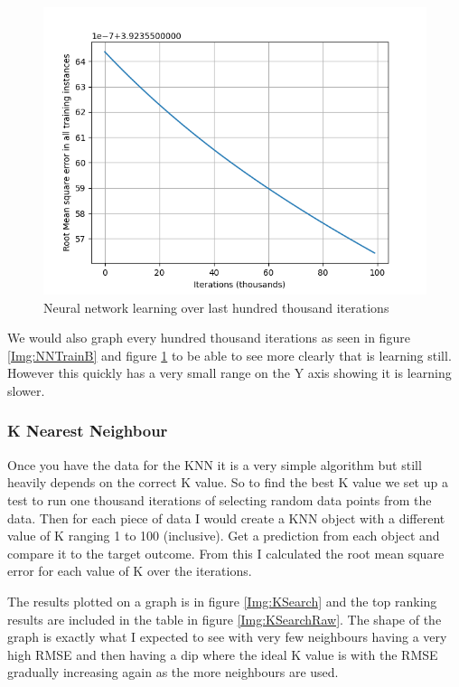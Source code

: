 \documentclass[11pt]{article}
\begin{document}
\begin{figure}[!htb]
	\centering
	\includegraphics{Resources/PartTwo/LearningGraphs/ActualRun/20220128_122722_1000_1.png}
	\caption{Neural network learning over last hundred thousand iterations}
	\label{Img:NNTrainC}
\end{figure}

 	We would also graph every hundred thousand iterations as seen in figure \ref{Img:NNTrainB} and figure \ref{Img:NNTrainC} to be able to see more clearly that is learning still. However this quickly has a very small range on the Y axis showing it is learning slower.

	\subsubsection{K Nearest Neighbour}
	Once you have the data for the KNN it is a very simple algorithm but still heavily depends on the correct K value. So to find the best K value we set up a test to run one thousand iterations of selecting random data points from the data. Then for each piece of data I would create a KNN object with a different value of K ranging 1 to 100 (inclusive). Get a prediction from each object and compare it to the target outcome. From this I calculated the root mean square error for each value of K over the iterations.

	The results plotted on a graph is in figure \ref{Img:KSearch} and the top ranking results are included in the table in figure \ref{Img:KSearchRaw}.
	The shape of the graph is exactly what I expected to see with very few neighbours having a very high RMSE and then having a dip where the ideal K value is with the RMSE gradually increasing again as the more neighbours are used.
\end{document}
